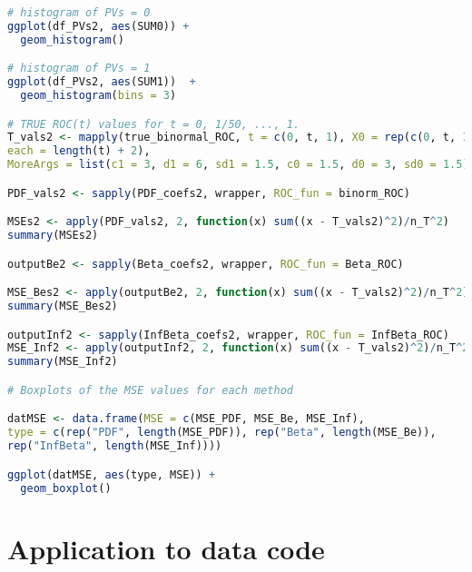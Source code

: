 \documentclass{article}
\begin{document}
\begin{lstlisting}[language=R]
# histogram of PVs = 0
ggplot(df_PVs2, aes(SUM0)) +
  geom_histogram()

# histogram of PVs = 1
ggplot(df_PVs2, aes(SUM1))  +
  geom_histogram(bins = 3)

# TRUE ROC(t) values for t = 0, 1/50, ..., 1.
T_vals2 <- mapply(true_binormal_ROC, t = c(0, t, 1), X0 = rep(c(0, t, 1), 
each = length(t) + 2), 
MoreArgs = list(c1 = 3, d1 = 6, sd1 = 1.5, c0 = 1.5, d0 = 3, sd0 = 1.5))

PDF_vals2 <- sapply(PDF_coefs2, wrapper, ROC_fun = binorm_ROC)

MSEs2 <- apply(PDF_vals2, 2, function(x) sum((x - T_vals2)^2)/n_T^2)
summary(MSEs2)

outputBe2 <- sapply(Beta_coefs2, wrapper, ROC_fun = Beta_ROC)

MSE_Bes2 <- apply(outputBe2, 2, function(x) sum((x - T_vals2)^2)/n_T^2)
summary(MSE_Bes2)

outputInf2 <- sapply(InfBeta_coefs2, wrapper, ROC_fun = InfBeta_ROC)
MSE_Inf2 <- apply(outputInf2, 2, function(x) sum((x - T_vals2)^2)/n_T^2)
summary(MSE_Inf2)

# Boxplots of the MSE values for each method

datMSE <- data.frame(MSE = c(MSE_PDF, MSE_Be, MSE_Inf), 
type = c(rep("PDF", length(MSE_PDF)), rep("Beta", length(MSE_Be)),
rep("InfBeta", length(MSE_Inf))))

ggplot(datMSE, aes(type, MSE)) +
  geom_boxplot()
\end{lstlisting}

\section{Application to data code}
\end{document}
